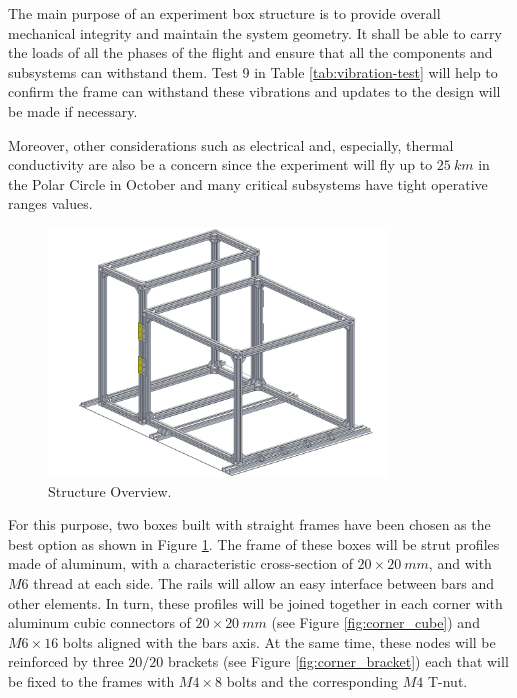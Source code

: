 The main purpose of an experiment box structure is to provide overall mechanical integrity and maintain the system geometry. It shall be able to carry the loads of all the phases of the flight and ensure that all the components and subsystems can withstand them. Test 9 in Table \ref{tab:vibration-test} will help to confirm the frame can withstand these vibrations and updates to the design will be made if necessary.

Moreover, other considerations such as electrical and, especially, thermal conductivity are also be a concern since the experiment will fly up to $25\ km$ in the Polar Circle in October and many critical subsystems have tight operative ranges values.

 \begin{figure}[H]
     \centering
     \includegraphics[width=0.8\textwidth]{4-experiment-design/img/Mechanical/structure_pic.jpg}
     \caption{Structure Overview.}
     \label{fig:structure}
\end{figure}

For this purpose, two boxes built with straight frames have been chosen as the best option as shown in Figure \ref{fig:structure}. The frame of these boxes will be strut profiles made of aluminum, with a characteristic cross-section of $20\times20\ mm$, and with $M6$ thread at each side. The rails will allow an easy interface between bars and other elements. In turn, these profiles will be joined together in each corner with aluminum cubic connectors of $20\times20\ mm$ (see Figure \ref{fig:corner_cube}) and $M6\times16$ bolts aligned with the bars axis. At the same time, these nodes will be reinforced by three $20/20$ brackets (see Figure \ref{fig:corner_bracket}) each that will be fixed to the frames with $M4\times8$ bolts and the corresponding $M4$ T-nut.

